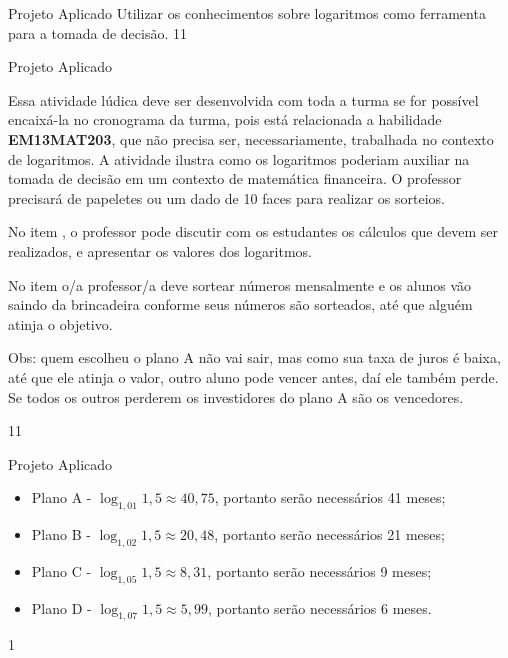 \clearpage
\def\currentcolor{cor2}

\begin{objectives}{Projeto Aplicado}
{
Utilizar os conhecimentos sobre logaritmos como ferramenta para a tomada de decisão.
}{1}{1}
\end{objectives}

\begin{sugestions}{Projeto Aplicado}
{
Essa atividade lúdica deve ser desenvolvida com toda a turma se for possível encaixá-la no cronograma da turma, pois está relacionada a habilidade \textbf{EM13MAT203}, que não precisa ser, necessariamente, trabalhada no contexto de logaritmos. A atividade ilustra como os logaritmos poderiam auxiliar na tomada de decisão em um contexto de matemática financeira. O professor precisará de papeletes ou um dado de 10 faces para realizar os sorteios.

No item , o professor pode discutir com os estudantes os cálculos que devem ser realizados, e apresentar os valores dos logaritmos.

No item  o/a professor/a deve sortear números mensalmente e os alunos vão saindo da brincadeira conforme seus números são sorteados, até que alguém atinja o objetivo.

Obs: quem escolheu o plano A não vai  sair, mas como sua taxa de juros é baixa, até que ele atinja o valor, outro aluno pode vencer antes, daí ele também perde. Se todos os outros perderem os investidores do plano A são os vencedores. 
}{1}{1}
\end{sugestions}


\begin{answer}{Projeto Aplicado}
{
	\begin{itemize}
	\item Plano A - $\log_{1,01} 1,5 \approx 40,75$, portanto serão necessários 41 meses; 
	\item Plano B - $\log_{1,02} 1,5 \approx 20,48$, portanto serão necessários 21 meses;
	\item Plano C - $\log_{1,05} 1,5 \approx 8,31$, portanto serão necessários 9 meses;
	\item Plano D - $\log_{1,07} 1,5 \approx 5,99$, portanto serão necessários 6 meses.
	\end{itemize}
}{1}
\end{answer}

